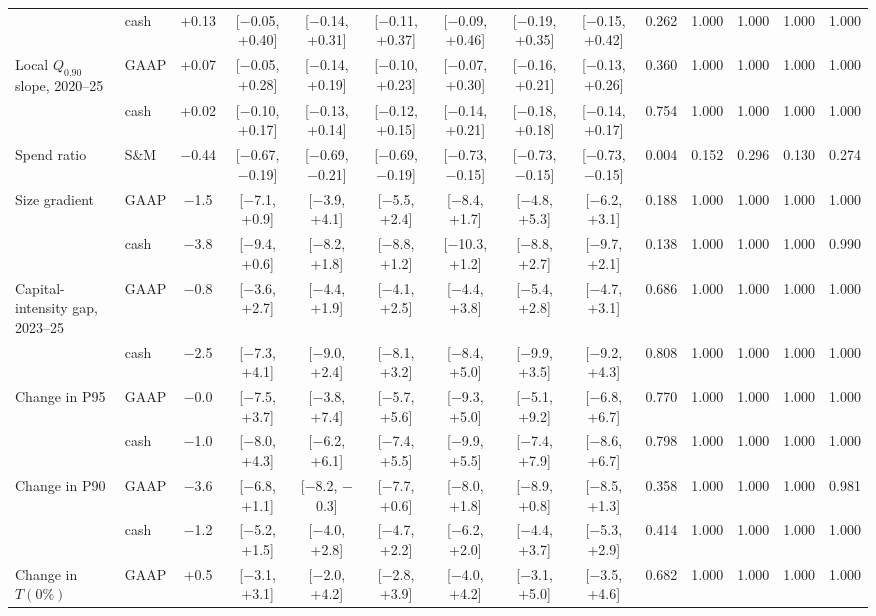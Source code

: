 \begin{table}[t]
{\begin{tabular}{llcccccccccccc}
 & cash & +0.13 & [$-$0.05, +0.40] & [$-$0.14, +0.31] & [$-$0.11, +0.37] & [$-$0.09, +0.46] & [$-$0.19, +0.35] & [$-$0.15, +0.42] & 0.262 & 1.000 & 1.000 & 1.000 & 1.000 \\
Local $Q_{0.90}$ slope, 2020--25 & GAAP & +0.07 & [$-$0.05, +0.28] & [$-$0.14, +0.19] & [$-$0.10, +0.23] & [$-$0.07, +0.30] & [$-$0.16, +0.21] & [$-$0.13, +0.26] & 0.360 & 1.000 & 1.000 & 1.000 & 1.000 \\
 & cash & +0.02 & [$-$0.10, +0.17] & [$-$0.13, +0.14] & [$-$0.12, +0.15] & [$-$0.14, +0.21] & [$-$0.18, +0.18] & [$-$0.14, +0.17] & 0.754 & 1.000 & 1.000 & 1.000 & 1.000 \\
Spend ratio & S\&M & $-$0.44 & [$-$0.67, $-$0.19] & [$-$0.69, $-$0.21] & [$-$0.69, $-$0.19] & [$-$0.73, $-$0.15] & [$-$0.73, $-$0.15] & [$-$0.73, $-$0.15] & 0.004 & 0.152 & 0.296 & 0.130 & 0.274 \\
Size gradient & GAAP & $-$1.5 & [$-$7.1, +0.9] & [$-$3.9, +4.1] & [$-$5.5, +2.4] & [$-$8.4, +1.7] & [$-$4.8, +5.3] & [$-$6.2, +3.1] & 0.188 & 1.000 & 1.000 & 1.000 & 1.000 \\
 & cash & $-$3.8 & [$-$9.4, +0.6] & [$-$8.2, +1.8] & [$-$8.8, +1.2] & [$-$10.3, +1.2] & [$-$8.8, +2.7] & [$-$9.7, +2.1] & 0.138 & 1.000 & 1.000 & 1.000 & 0.990 \\
Capital-intensity gap, 2023--25 & GAAP & $-$0.8 & [$-$3.6, +2.7] & [$-$4.4, +1.9] & [$-$4.1, +2.5] & [$-$4.4, +3.8] & [$-$5.4, +2.8] & [$-$4.7, +3.1] & 0.686 & 1.000 & 1.000 & 1.000 & 1.000 \\
 & cash & $-$2.5 & [$-$7.3, +4.1] & [$-$9.0, +2.4] & [$-$8.1, +3.2] & [$-$8.4, +5.0] & [$-$9.9, +3.5] & [$-$9.2, +4.3] & 0.808 & 1.000 & 1.000 & 1.000 & 1.000 \\
Change in P95 & GAAP & $-$0.0 & [$-$7.5, +3.7] & [$-$3.8, +7.4] & [$-$5.7, +5.6] & [$-$9.3, +5.0] & [$-$5.1, +9.2] & [$-$6.8, +6.7] & 0.770 & 1.000 & 1.000 & 1.000 & 1.000 \\
 & cash & $-$1.0 & [$-$8.0, +4.3] & [$-$6.2, +6.1] & [$-$7.4, +5.5] & [$-$9.9, +5.5] & [$-$7.4, +7.9] & [$-$8.6, +6.7] & 0.798 & 1.000 & 1.000 & 1.000 & 1.000 \\
Change in P90 & GAAP & $-$3.6 & [$-$6.8, +1.1] & [$-$8.2, $-$0.3] & [$-$7.7, +0.6] & [$-$8.0, +1.8] & [$-$8.9, +0.8] & [$-$8.5, +1.3] & 0.358 & 1.000 & 1.000 & 1.000 & 0.981 \\
 & cash & $-$1.2 & [$-$5.2, +1.5] & [$-$4.0, +2.8] & [$-$4.7, +2.2] & [$-$6.2, +2.0] & [$-$4.4, +3.7] & [$-$5.3, +2.9] & 0.414 & 1.000 & 1.000 & 1.000 & 1.000 \\
Change in $T(0\%)$ & GAAP & +0.5 & [$-$3.1, +3.1] & [$-$2.0, +4.2] & [$-$2.8, +3.9] & [$-$4.0, +4.2] & [$-$3.1, +5.0] & [$-$3.5, +4.6] & 0.682 & 1.000 & 1.000 & 1.000 & 1.000 \\

\end{tabular}}
\end{table}
